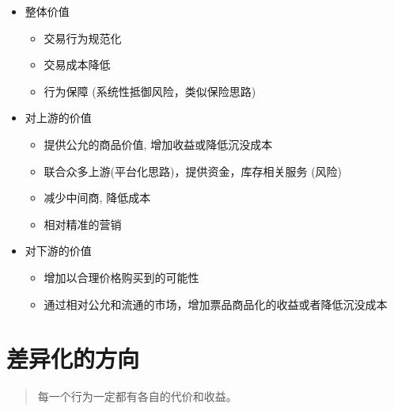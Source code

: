 \documentclass[11pt,a4paper]{article}
\begin{document}
\begin{itemize}
\item 整体价值
\begin{itemize}
\item 交易行为规范化
\item 交易成本降低
\item 行为保障 (系统性抵御风险，类似保险思路)
\end{itemize}

\item 对上游的价值
\begin{itemize}
\item 提供公允的商品价值, 增加收益或降低沉没成本
\item 联合众多上游(平台化思路)，提供资金，库存相关服务 (风险)
\item 减少中间商, 降低成本
\item 相对精准的营销
\end{itemize}

\item 对下游的价值
\begin{itemize}
\item 增加以合理价格购买到的可能性
\item 通过相对公允和流通的市场，增加票品商品化的收益或者降低沉没成本
\end{itemize}
\end{itemize}


\section*{差异化的方向}
\label{sec:orgheadline11}

\begin{quote}
每一个行为一定都有各自的代价和收益。
\end{quote}
\end{document}

